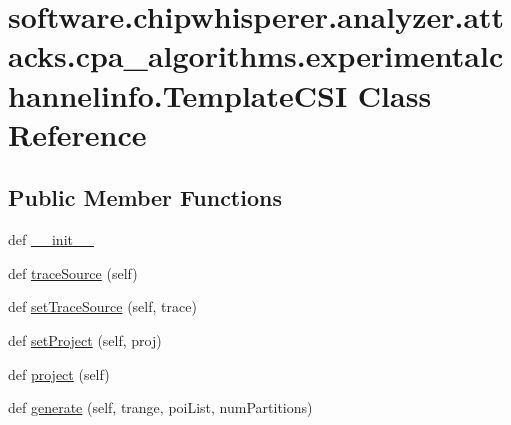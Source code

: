 \hypertarget{classsoftware_1_1chipwhisperer_1_1analyzer_1_1attacks_1_1cpa__algorithms_1_1experimentalchannelinfo_1_1TemplateCSI}{}\section{software.\+chipwhisperer.\+analyzer.\+attacks.\+cpa\+\_\+algorithms.\+experimentalchannelinfo.\+Template\+C\+S\+I Class Reference}
\label{classsoftware_1_1chipwhisperer_1_1analyzer_1_1attacks_1_1cpa__algorithms_1_1experimentalchannelinfo_1_1TemplateCSI}
\subsection*{Public Member Functions}
\begin{DoxyCompactItemize}
\item 
def \hyperlink{classsoftware_1_1chipwhisperer_1_1analyzer_1_1attacks_1_1cpa__algorithms_1_1experimentalchannelinfo_1_1TemplateCSI_ad415ff4220eb96c8a9c0ed88e0138b02}{\+\_\+\+\_\+init\+\_\+\+\_\+}
\item 
def \hyperlink{classsoftware_1_1chipwhisperer_1_1analyzer_1_1attacks_1_1cpa__algorithms_1_1experimentalchannelinfo_1_1TemplateCSI_a14927a5bb497ab99addff3da7d81e971}{trace\+Source} (self)
\item 
def \hyperlink{classsoftware_1_1chipwhisperer_1_1analyzer_1_1attacks_1_1cpa__algorithms_1_1experimentalchannelinfo_1_1TemplateCSI_a92590fa3ed102699f7ba8acc3b243fec}{set\+Trace\+Source} (self, trace)
\item 
def \hyperlink{classsoftware_1_1chipwhisperer_1_1analyzer_1_1attacks_1_1cpa__algorithms_1_1experimentalchannelinfo_1_1TemplateCSI_aa3d0f6e7f722c2b11694e815a3d0d538}{set\+Project} (self, proj)
\item 
def \hyperlink{classsoftware_1_1chipwhisperer_1_1analyzer_1_1attacks_1_1cpa__algorithms_1_1experimentalchannelinfo_1_1TemplateCSI_a0b849488dc6c50d9b3b661827f87f7fb}{project} (self)
\item 
def \hyperlink{classsoftware_1_1chipwhisperer_1_1analyzer_1_1attacks_1_1cpa__algorithms_1_1experimentalchannelinfo_1_1TemplateCSI_ae2f13b800f3aad50dfca36f2ede60c9d}{generate} (self, trange, poi\+List, num\+Partitions)
\end{DoxyCompactItemize}
